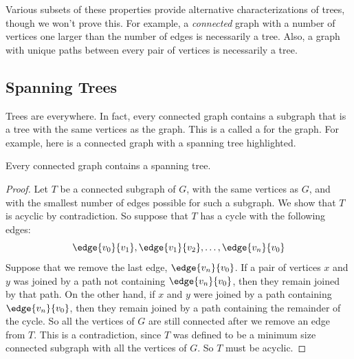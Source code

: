 Various subsets of these properties provide alternative characterizations
of trees, though we won't prove this.  For example, a \emph{connected}
graph with a number of vertices one larger than the number of edges is
necessarily a tree.  Also, a graph with unique paths between every pair of
vertices is necessarily a tree.

\subsection{Spanning Trees}
Trees are everywhere.  In fact, every connected graph contains a
subgraph that is a tree with the same vertices as the graph.  This is a
called a  for the graph.  For example, here is a
connected graph with a spanning tree highlighted.

\begin{theorem}
Every connected graph contains a spanning tree.
\end{theorem}

\begin{proof}
Let $T$ be a connected subgraph of $G$, with the same vertices as $G$, and
with the smallest number of edges possible for such a subgraph.  We show
that $T$ is acyclic by contradiction.  So suppose that $T$ has a cycle
with the following edges:
\[
\edge{v_0}{v_1}, \edge{v_1}{v_2}, \dots, \edge{v_n}{v_0}
\]
Suppose that we remove the last edge, $\edge{v_n}{v_0}$.  If a pair of
vertices $x$ and $y$ was joined by a path not containing
$\edge{v_n}{v_0}$, then they remain joined by that path.  On the other
hand, if $x$ and $y$ were joined by a path containing $\edge{v_n}{v_0}$,
then they remain joined by a path containing the remainder of the cycle.
So all the vertices of $G$ are still connected after we remove an edge
from $T$.  This is a contradiction, since $T$ was defined to be a minimum
size connected subgraph with all the vertices of $G$.  So $T$ must be
acyclic.
\end{proof}

\iffalse
